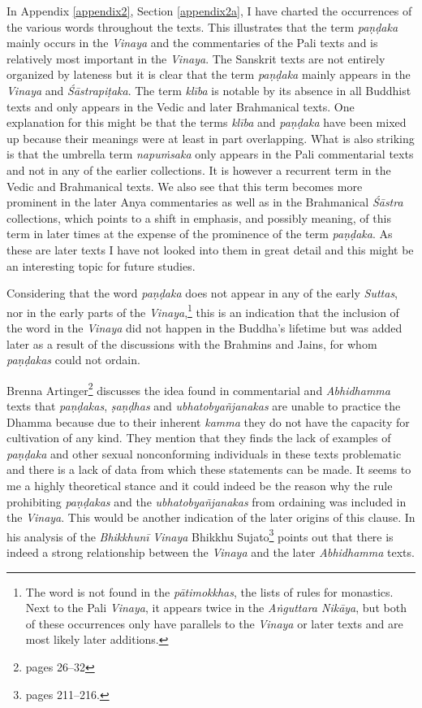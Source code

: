 In Appendix \ref{appendix2}, Section \ref{appendix2a}, I have charted the occurrences of the various words throughout the texts. This illustrates that the term \textit{paṇḍaka} mainly occurs in the \textit{Vinaya} and the commentaries of the Pali texts and is relatively most important in the \textit{Vinaya}. The Sanskrit texts are not entirely organized by lateness but it is clear that the term \textit{paṇḍaka} mainly appears in the \textit{Vinaya} and \textit{Śāstrapiṭaka}. The term \textit{klība} is notable by its absence in all Buddhist texts and only appears in the Vedic and later Brahmanical texts. One explanation for this might be that the terms \textit{klība} and \textit{paṇḍaka} have been mixed up because their meanings were at least in part overlapping. What is also striking is that the umbrella term \textit{napuṁsaka} only appears in the Pali commentarial texts and not in any of the earlier collections. It is however a recurrent term in the Vedic and Brahmanical texts. We also see that this term becomes more prominent in the later Anya commentaries as well as in the Brahmanical \textit{Śāstra} collections, which points to a shift in emphasis, and possibly meaning, of this term in later times at the expense of the prominence of the term \textit{paṇḍaka}. As these are later texts I have not looked into them in great detail and this might be an interesting topic for future studies.

Considering that the word \textit{paṇḍaka} does not appear in any of the early \textit{Suttas}, nor in the early parts of the \textit{Vinaya},\footnote{The word is not found in the \textit{pātimokkhas}, the lists of rules for monastics. Next to the Pali \textit{Vinaya}, it appears twice in the \textit{Aṅguttara Nikāya}, but both of these occurrences only have parallels to the \textit{Vinaya} or later texts and are most likely later additions.} this is an indication that the inclusion of the word in the \textit{Vinaya} did not happen in the Buddha's lifetime but was added later as a result of the discussions with the Brahmins and Jains, for whom \textit{paṇḍakas} could not ordain.

Brenna Artinger\footnote{\cite{artinger} pages 26–32} discusses the idea found in commentarial and \textit{Abhidhamma} texts that \textit{paṇḍakas}, \textit{ṣaṇḍhas} and \textit{ubhatob­yañ­janakas} are unable to practice the Dhamma because due to their inherent \textit{kamma} they do not have the capacity for cultivation of any kind. They mention that they finds the lack of examples of \textit{paṇḍaka} and other sexual nonconforming individuals in these texts problematic and there is a lack of data from which these statements can be made. It seems to me a highly theoretical stance and it could indeed be the reason why the rule prohibiting \textit{paṇḍakas} and the \textit{ubhatob­yañ­janakas} from ordaining was included in the \textit{Vinaya}. This would be another indication of the later origins of this clause. In his analysis of the \textit{Bhikkhunī} \textit{Vinaya} Bhikkhu Sujato\footnote{\cite{sujato2009} pages 211–216.} points out that there is indeed a strong relationship between the \textit{Vinaya} and the later \textit{Abhidhamma} texts.

